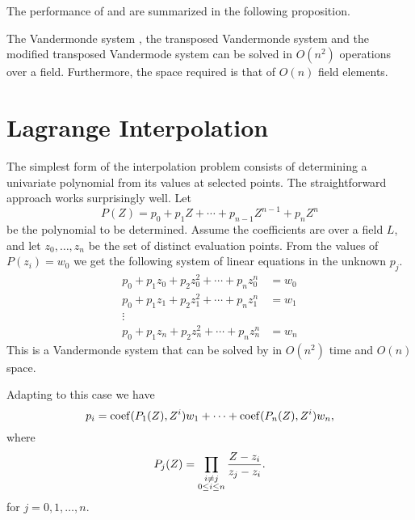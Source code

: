 \noindent
The performance of  and
 are summarized in the following
proposition.

\begin{proposition}
The Vandermonde system , the transposed
Vandermonde system  and the modified
transposed Vandermode system  can be solved in
$O(n^2)$ operations over a field.  Furthermore, the space required
is that of $O(n)$ field elements.
\end{proposition}

\section{Lagrange Interpolation}
\label{Interp:Lagrange:Sec}

The simplest form of the interpolation problem consists of determining
a univariate polynomial from its values at selected points.  The
straightforward approach works surprisingly well.  Let
\[
P(Z) = p_0 + p_1 Z + \cdots + p_{n-1} Z^{n-1} + p_n Z^n
\]
be the polynomial to be determined.  Assume the coefficients are over
a field $L$, and let $z_0, \ldots, z_n$ be the set of distinct
evaluation points.  From the values of $P(z_i) = w_0$ we get the
following system of linear equations in the unknown $p_j$.
\[
\begin{aligned}
p_0 + p_1 z_0 + p_2 z_0^2 + \cdots + p_n z_0^n &=  w_0\\
p_0 + p_1 z_1 + p_2 z_1^2 + \cdots + p_n z_1^n &=  w_1\\
\vdots&\\
p_0 + p_1 z_n + p_2 z_n^2 + \cdots + p_n z_n^n &=  w_n
\end{aligned}
\]
This is a Vandermonde system that can be solved by
 in $O(n^2)$ time and $O(n)$ space.

Adapting  to this case we have
\[
p_i = \operatorname{coef}(P_1(Z), Z^{i}) w_1 + \cdots
       + \operatorname{coef}(P_n(Z), Z^{i}) w_n,
\]
where 
\[
P_j(Z) = \prod_{\substack{i\not=j \\ 0\le i\le n}}{Z - z_i \over z_j - z_i}.
\]
for $j = 0, 1, \ldots, n$.


